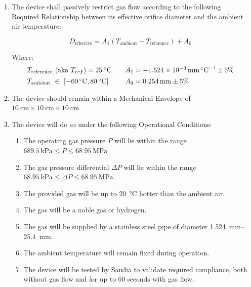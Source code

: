 \documentclass[12pt, letterpaper]{report}%
\newcommand{\requiredRelationship}{D_{\text{effective}} = A_1 (T_{\text{ambient}} - T_{\text{reference}}) + A_0}
\newcommand{\Thot}{\SI{80}{\degreeCelsius}} %
\newcommand{\Tcold}{\SI{-60}{\degreeCelsius}} %
\newcommand{\Tref}{\SI{25}{\degreeCelsius}} %
\newcommand{\specPressure}{\SI{68.95}{\mega \pascal}}%
\newcommand{\AoneExact}{\SI{-1.524e-3}{\milli\meter\per\celsius}}
\newcommand{\Aone}{\AoneExact \pm 5\%}
\newcommand{\AzeroExact}{\SI{0.254}{\milli\meter}}
\newcommand{\Azero}{\AzeroExact \pm 5\%}
\begin{document}
		\begin{enumerate}
			\item The device shall passively restrict gas flow according to the following Required Relationship between its effective orifice diameter and the ambient air temperature:
			
				\begin{equation}
					\requiredRelationship
					\label{eq:required_relationship}
				\end{equation}

				Where:
				\[
				\begin{array}{@{} l @{\qquad} l @{}}
					T_{\text{reference}} \text{ (aka } T_{ref}\text{)} = \Tref
						& A_1 = \Aone \\[4pt]
					T_{\text{ambient}}\ \in\ [\Tcold,\Thot]\
						& A_0 = \Azero
				\end{array}
				\]

			\item The device should remain within a Mechanical Envelope of $\SI{10}{\centi\meter} \times \SI{10}{\centi\meter} \times \SI{10}{\centi\meter}$
			
			\item The device will do so under the following Operational Conditions:
			
				\begin{enumerate}
					\item \label{cond:P} 		The operating gas pressure $P$ will lie within the range $\SI{689.5}{\kilo\pascal} \leq P \leq \specPressure$
					\item \label{cond:dP} 	The gas pressure differential $\Delta P$ will lie within the range $\SI{68.95}{\kilo\pascal} \leq \Delta P \leq \specPressure$.
					\item \label{cond:dT} 	The provided gas will be up to \SI{20}{\degreeCelsius} hotter than the ambient air.
					\item \label{cond:gas} 	The gas will be a noble gas or hydrogen.
					\item \label{cond:pipe} The gas will be supplied by a stainless steel pipe of diameter \SIrange{1.524}{25.4}{\milli\meter}.
					\item \label{cond:fix} 	The ambient temperature will remain fixed during operation.
					\item \label{cond:test} The device will be tested by Sandia to validate required compliance, both without gas flow and for up to 60 seconds with gas flow.
				\end{enumerate}

		\end{enumerate}
		
\end{document}
